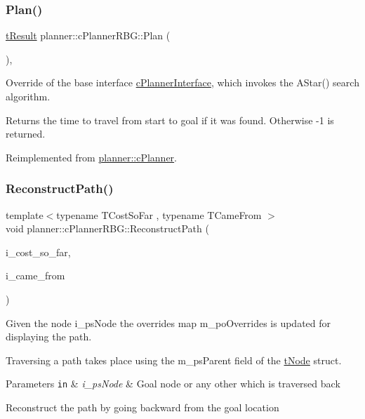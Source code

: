\subsubsection{\texorpdfstring{Plan()}{Plan()}}
{\footnotesize\ttfamily \mbox{\hyperlink{structt_result}{t\+Result}} planner\+::c\+Planner\+R\+B\+G\+::\+Plan (\begin{DoxyParamCaption}{ }\end{DoxyParamCaption})\hspace{0.3cm}{\ttfamily [override]}, {\ttfamily [virtual]}}



Override of the base interface \mbox{\hyperlink{classplanner_1_1c_planner_interface}{c\+Planner\+Interface}}, which invokes the A\+Star() search algorithm. 

\begin{DoxyReturn}{Returns}
the time to travel from start to goal if it was found. Otherwise -\/1 is returned. 
\end{DoxyReturn}


Reimplemented from \mbox{\hyperlink{classplanner_1_1c_planner_a21230c015260b9fc34ad2f239592470e}{planner\+::c\+Planner}}.

\mbox{\label{classplanner_1_1c_planner_r_b_g_a1af74d398b286f1e05e6ade495efbbd0}} 
\subsubsection{\texorpdfstring{Reconstruct\+Path()}{ReconstructPath()}}
{\footnotesize\ttfamily template$<$typename T\+Cost\+So\+Far , typename T\+Came\+From $>$ \\
void planner\+::c\+Planner\+R\+B\+G\+::\+Reconstruct\+Path (\begin{DoxyParamCaption}\item[{T\+Cost\+So\+Far \&\&}]{i\+\_\+cost\+\_\+so\+\_\+far,  }\item[{T\+Came\+From \&\&}]{i\+\_\+came\+\_\+from }\end{DoxyParamCaption})}



Given the node i\+\_\+ps\+Node the overrides map m\+\_\+po\+Overrides is updated for displaying the path. 

Traversing a path takes place using the m\+\_\+ps\+Parent field of the \mbox{\hyperlink{structplanner_1_1t_node}{t\+Node}} struct. 
\begin{DoxyParams}[1]{Parameters}
\mbox{\tt in}  & {\em i\+\_\+ps\+Node} & Goal node or any other which is traversed back \\
\hline
\end{DoxyParams}
Reconstruct the path by going backward from the goal location

